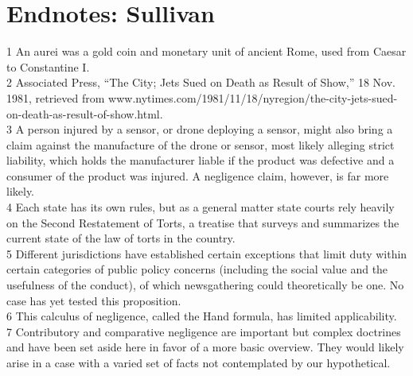 \section{Endnotes: Sullivan}
1 An aurei was a gold coin and monetary unit of ancient Rome, used from Caesar to Constantine I.\\
2 Associated Press, ``The City; Jets Sued on Death as Result of Show,'' 18 Nov. 1981, retrieved from
www.nytimes.com/1981/11/18/nyregion/the-city-jets-sued-on-death-as-result-of-show.html.\\
3 A person injured by a sensor, or drone deploying a sensor, might also bring a claim against
the manufacture of the drone or sensor, most likely alleging strict liability, which holds the
manufacturer liable if the product was defective and a consumer of the product was injured.
A negligence claim, however, is far more likely.\\
4 Each state has its own rules, but as a general matter state courts rely heavily on the Second
Restatement of Torts, a treatise that surveys and summarizes the current state of the law of
torts in the country.\\
5 Different jurisdictions have established certain exceptions that limit duty within certain categories
of public policy concerns (including the social value and the usefulness of the conduct), of which
newsgathering could theoretically be one. No case has yet tested this proposition.\\
6 This calculus of negligence, called the Hand formula, has limited applicability.\\
7 Contributory and comparative negligence are important but complex doctrines and have been set
aside here in favor of a more basic overview. They would likely arise in a case with a varied set of
facts not contemplated by our hypothetical.\\


